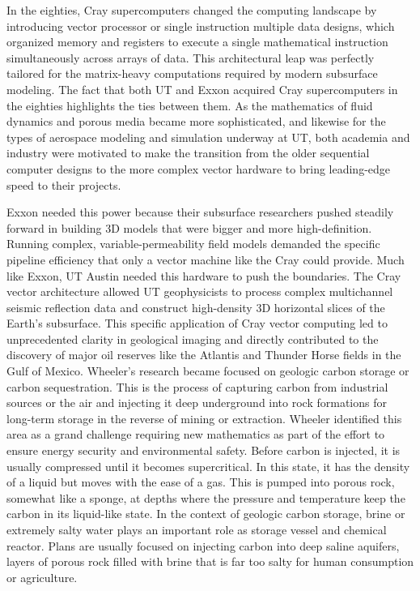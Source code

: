 In the eighties, Cray supercomputers changed the computing landscape by introducing vector processor or single instruction multiple data designs, which organized memory and registers to execute a single mathematical instruction simultaneously across arrays of data. This architectural leap was perfectly tailored for the matrix-heavy computations required by modern subsurface modeling. The fact that both UT and Exxon acquired Cray supercomputers in the eighties highlights the ties between them. As the mathematics of fluid dynamics and porous media became more sophisticated, and likewise for the types of aerospace modeling and simulation underway at UT, both academia and industry were motivated to make the transition from the older sequential computer designs to the more complex vector hardware to bring leading-edge speed to their projects. 

Exxon needed this power because their subsurface researchers pushed steadily forward in building 3D models that were bigger and more high-definition. Running complex, variable-permeability field models demanded the specific pipeline efficiency that only a vector machine like the Cray could provide. Much like Exxon, UT Austin needed this hardware to push the boundaries. The Cray vector architecture allowed UT geophysicists to process complex multichannel seismic reflection data and construct high-density 3D horizontal slices of the Earth's subsurface. This specific application of Cray vector computing led to unprecedented clarity in geological imaging and directly contributed to the discovery of major oil reserves like the Atlantis and Thunder Horse fields in the Gulf of Mexico.
Wheeler’s research became focused on geologic carbon storage or carbon sequestration. This is the process of capturing carbon from industrial sources or the air and injecting it deep underground into rock formations for long-term storage in the reverse of mining or extraction. Wheeler identified this area as a grand challenge requiring new mathematics as part of the effort to ensure energy security and environmental safety. Before carbon is injected, it is usually compressed until it becomes supercritical. In this state, it has the density of a liquid but moves with the ease of a gas. This is pumped into porous rock, somewhat like a sponge, at depths where the pressure and temperature keep the carbon in its liquid-like state. In the context of geologic carbon storage, brine or extremely salty water plays an important role as storage vessel and  chemical reactor. Plans are usually focused on injecting carbon into deep saline aquifers, layers of porous rock filled with brine that is far too salty for human consumption or agriculture. 

